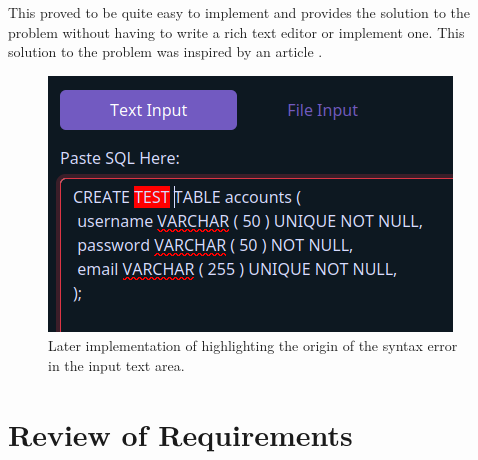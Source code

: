 This proved to be quite easy to implement and provides the solution to the problem without having to write a rich text editor or implement one. This solution to the problem was inspired by an article \cite{fakeTextArea}.

\begin{figure}[h!]
	\centering
	\includegraphics[scale = 1]{highlightedTextArea}
	\caption{Later implementation of highlighting the origin of the syntax error in the input text area.}
	\label{fig:highlightedTextArea}
\end{figure}

\newpage

\section{Review of Requirements}

